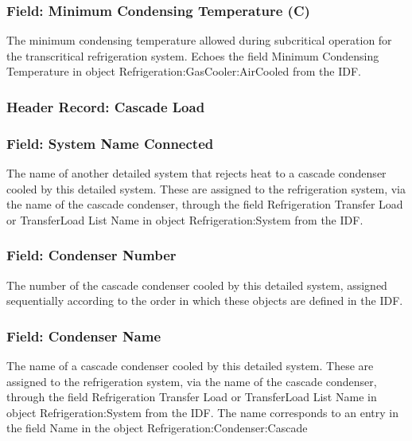 \subsubsection{Field: Minimum Condensing Temperature (C)}\label{field-minimum-condensing-temperature-c-1}

The minimum condensing temperature allowed during subcritical operation for the transcritical refrigeration system. Echoes the field Minimum Condensing Temperature in object Refrigeration:GasCooler:AirCooled from the IDF.

\subsubsection{Header Record: Cascade Load}\label{header-record-cascade-load}

\subsubsection{Field: System Name Connected}\label{field-system-name-connected}

The name of another detailed system that rejects heat to a cascade condenser cooled by this detailed system. These are assigned to the refrigeration system, via the name of the cascade condenser, through the field Refrigeration Transfer Load or TransferLoad List Name in object Refrigeration:System from the IDF.

\subsubsection{Field: Condenser Number}\label{field-condenser-number}

The number of the cascade condenser cooled by this detailed system, assigned sequentially according to the order in which these objects are defined in the IDF.

\subsubsection{Field: Condenser Name}\label{field-condenser-name}

The name of a cascade condenser cooled by this detailed system. These are assigned to the refrigeration system, via the name of the cascade condenser, through the field Refrigeration Transfer Load or TransferLoad List Name in object Refrigeration:System from the IDF. The name corresponds to an entry in the field Name in the object Refrigeration:Condenser:Cascade

